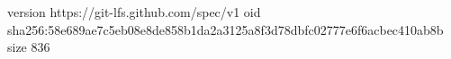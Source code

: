 version https://git-lfs.github.com/spec/v1
oid sha256:58e689ae7c5eb08e8de858b1da2a3125a8f3d78dbfc02777e6f6acbec410ab8b
size 836
